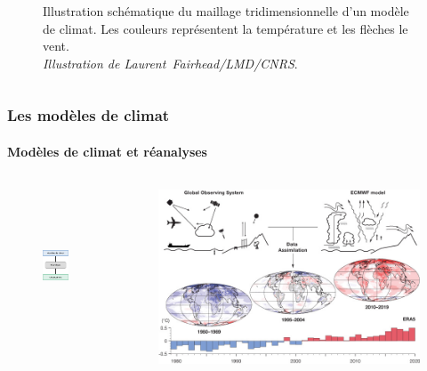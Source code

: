 \documentclass[aspectratio=169, usepdftitle=false, xcolor={dvipsnames}, 9pt,table]{beamer}
\begin{document}
\begin{frame}[c]
\begin{columns}
{\begin{column}{0.45\textwidth}
\begin{figure}[t]
                    \captionsetup{width=0.9\textwidth}
                    \caption{Illustration schématique du maillage tridimensionnelle d'un modèle de climat. Les couleurs représentent la température et les flèches
                    le vent.\\\textit{Illustration de \mbox{Laurent Fairhead/LMD/CNRS}}.}
                \end{figure}
            \end{column}
        }
    \end{columns} 
\end{frame}

\begin{frame}
    \frametitle{Les modèles de climat}
    \framesubtitle{Modèles de climat et réanalyses}
    \begin{columns}[t]
        \begin{column}{0.45\textwidth}
           \begin{figure}
               \centering
               \includegraphics[height=4.5cm]{Figures/schema_reanalyse_intermediaire.png}
           \end{figure} 
        \end{column}
        \begin{column}{0.45\textwidth}
           \begin{figure}
               \centering
               \includegraphics[width=\textwidth]{Figures/schema_reanalyse.jpg}

\end{figure}
\end{column}
\end{columns}
\end{frame}
\end{document}
